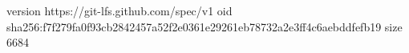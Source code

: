 version https://git-lfs.github.com/spec/v1
oid sha256:f7f279fa0f93cb2842457a52f2e0361e29261eb78732a2e3ff4c6aebddfefb19
size 6684
